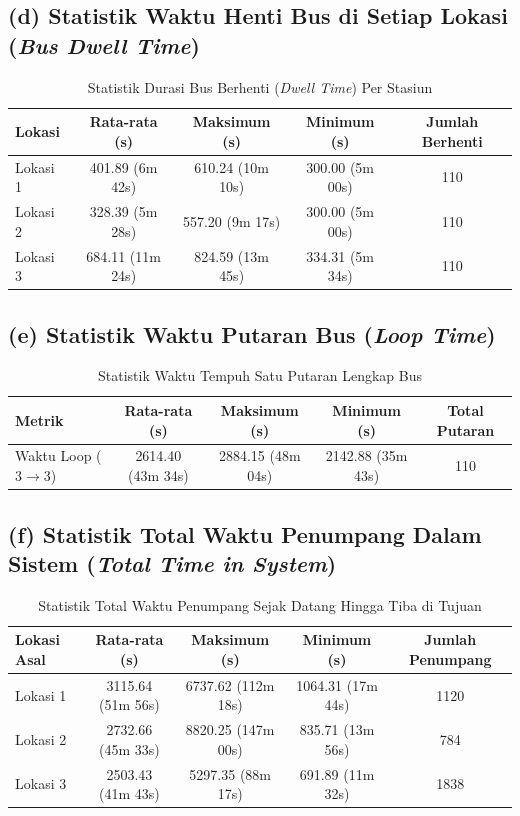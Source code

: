 \documentclass[11pt,a4paper]{article}
\begin{document}
\subsection*{(d) Statistik Waktu Henti Bus di Setiap Lokasi (\textit{Bus Dwell Time})}
\begin{table}[H]
\centering
\begin{tabular}{lcccc}
\toprule
\textbf{Lokasi} & \textbf{Rata-rata (s)} & \textbf{Maksimum (s)} & \textbf{Minimum (s)} & \textbf{Jumlah Berhenti} \\
\midrule
Lokasi 1 & 401.89 (6m 42s) & 610.24 (10m 10s) & 300.00 (5m 00s) & 110 \\
Lokasi 2 & 328.39 (5m 28s) & 557.20 (9m 17s) & 300.00 (5m 00s) & 110 \\
Lokasi 3 & 684.11 (11m 24s) & 824.59 (13m 45s) & 334.31 (5m 34s) & 110 \\
\bottomrule
\end{tabular}
\caption{Statistik Durasi Bus Berhenti (\textit{Dwell Time}) Per Stasiun}
\end{table}

\subsection*{(e) Statistik Waktu Putaran Bus (\textit{Loop Time})}
\begin{table}[H]
\centering
\begin{tabular}{lcccc}
\toprule
\textbf{Metrik} & \textbf{Rata-rata (s)} & \textbf{Maksimum (s)} & \textbf{Minimum (s)} & \textbf{Total Putaran} \\
\midrule
Waktu Loop ($3 \to 3$) & 2614.40 (43m 34s) & 2884.15 (48m 04s) & 2142.88 (35m 43s) & 110 \\
\bottomrule
\end{tabular}
\caption{Statistik Waktu Tempuh Satu Putaran Lengkap Bus}
\end{table}

\subsection*{(f) Statistik Total Waktu Penumpang Dalam Sistem (\textit{Total Time in System})}
\begin{table}[H]
\centering
\begin{tabular}{lcccc}
\toprule
\textbf{Lokasi Asal} & \textbf{Rata-rata (s)} & \textbf{Maksimum (s)} & \textbf{Minimum (s)} & \textbf{Jumlah Penumpang} \\
\midrule
Lokasi 1 & 3115.64 (51m 56s) & 6737.62 (112m 18s) & 1064.31 (17m 44s) & 1120 \\
Lokasi 2 & 2732.66 (45m 33s) & 8820.25 (147m 00s) & 835.71 (13m 56s) & 784 \\
Lokasi 3 & 2503.43 (41m 43s) & 5297.35 (88m 17s) & 691.89 (11m 32s) & 1838 \\
\bottomrule
\end{tabular}
\caption{Statistik Total Waktu Penumpang Sejak Datang Hingga Tiba di Tujuan}
\end{table}
\end{document}
